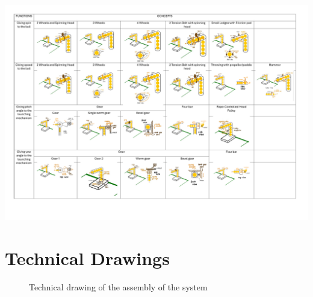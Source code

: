 \documentclass[12pt]{report}
\begin{document}
\begin{appendices}
\begin{center}
    \includegraphics[width=1.4\textwidth, page=5, angle=90]{morphological.pdf} %
\end{center}


\section{Technical Drawings}

\begin{figure}[H]
    \centering
    \caption{Technical drawing of the assembly of the system}
    \label{fig:technical-drawing}
\end{figure}



\end{appendices}
\end{document}

